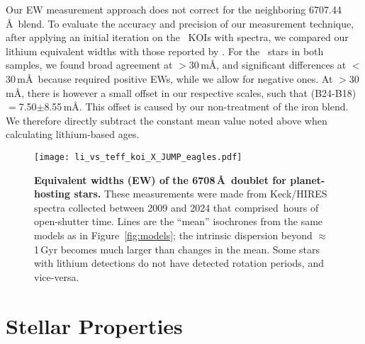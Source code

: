 \documentclass[11pt,twocolumn,tighten]{aastex63}
\begin{document}
Our EW measurement approach does not correct for the neighboring
 6707.44\,\AA\ blend.  To evaluate the accuracy and
precision of our measurement technique, after applying an initial
iteration on the \nlithiumstars\ KOIs with spectra, we compared our
lithium equivalent widths with those reported by
\citet{2018ApJ...855..115B}.  For the \nbergeroverlap\ stars in both
samples, we found broad agreement at $>$30\,m\AA, and significant
differences at $<$30\,m\AA\ because \citet{2018ApJ...855..115B}
required positive EWs, while we allow for negative ones.  At
$>$30\,m\AA, there is however a small offset in our respective scales,
such that (B24-B18)$=$7.50$\pm$8.55\,m\AA.  This offset is caused by
our non-treatment of the iron blend.  We therefore directly subtract
the constant mean value noted above when calculating lithium-based
ages.

\begin{figure}[!t]
	\begin{center}
		\leavevmode
		\texttt{[image: li\_vs\_teff\_koi\_X\_JUMP\_eagles.pdf]}
	\end{center}
	\vspace{-0.6cm}
	\caption{
    {\bf Equivalent widths (EW) of the  6708\,\AA\ doublet
    for planet-hosting stars.} These measurements were made from
    Keck/HIRES spectra collected between 2009 and 2024 that comprised
    \nhireshours\,hours of open-shutter time.  Lines are the ``mean''
    isochrones from the same models as in Figure~\ref{fig:models}; the
    intrinsic dispersion beyond $\approx$1\,Gyr becomes much larger
    than changes in the mean.  Some stars with lithium detections do
    not have detected rotation periods, and vice-versa.
		\label{fig:li_vs_teff}
	}
\end{figure}



\section{Stellar Properties}
\label{sec:stellarprops}



\end{document}
